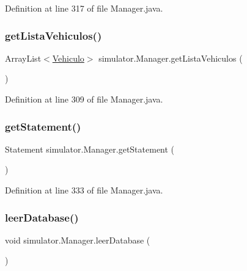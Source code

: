 Definition at line 317 of file Manager.\+java.

\mbox{\label{classsimulator_1_1_manager_a55b039767305793c0b904b49fe41cd56}} 
\subsubsection{\texorpdfstring{get\+Lista\+Vehiculos()}{getListaVehiculos()}}
{\footnotesize\ttfamily Array\+List$<$\mbox{\hyperlink{classsimulator_1_1_vehiculo}{Vehiculo}}$>$ simulator.\+Manager.\+get\+Lista\+Vehiculos (\begin{DoxyParamCaption}{ }\end{DoxyParamCaption})}



Definition at line 309 of file Manager.\+java.

\mbox{\label{classsimulator_1_1_manager_ad753f8ec42bb1b7a2d5c3b0a5ff7ed99}} 
\subsubsection{\texorpdfstring{get\+Statement()}{getStatement()}}
{\footnotesize\ttfamily Statement simulator.\+Manager.\+get\+Statement (\begin{DoxyParamCaption}{ }\end{DoxyParamCaption})}



Definition at line 333 of file Manager.\+java.

\mbox{\label{classsimulator_1_1_manager_a318010c8020487c27cc127fdfe75402a}} 
\subsubsection{\texorpdfstring{leer\+Database()}{leerDatabase()}}
{\footnotesize\ttfamily void simulator.\+Manager.\+leer\+Database (\begin{DoxyParamCaption}{ }\end{DoxyParamCaption})}

